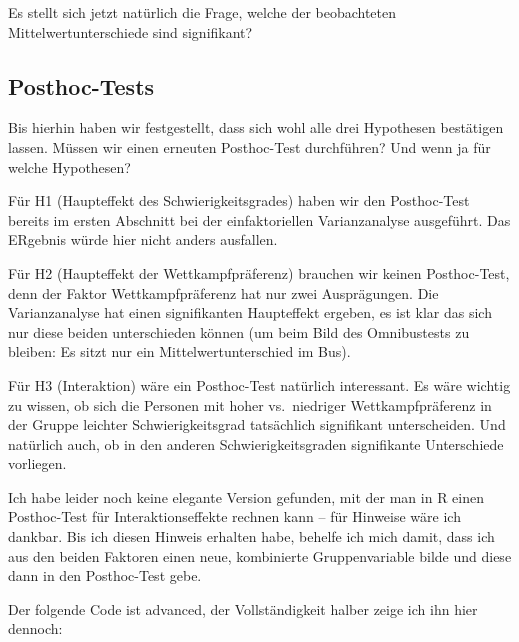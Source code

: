 \documentclass[
]{book}
\begin{document}
Es stellt sich jetzt natürlich die Frage, welche der beobachteten Mittelwertunterschiede sind signifikant?

\hypertarget{posthoc-tests}{%
\subsection{Posthoc-Tests}\label{posthoc-tests}}

Bis hierhin haben wir festgestellt, dass sich wohl alle drei Hypothesen bestätigen lassen. Müssen wir einen erneuten Posthoc-Test durchführen? Und wenn ja für welche Hypothesen?

Für H1 (Haupteffekt des Schwierigkeitsgrades) haben wir den Posthoc-Test bereits im ersten Abschnitt bei der einfaktoriellen Varianzanalyse ausgeführt. Das ERgebnis würde hier nicht anders ausfallen.

Für H2 (Haupteffekt der Wettkampfpräferenz) brauchen wir keinen Posthoc-Test, denn der Faktor Wettkampfpräferenz hat nur zwei Ausprägungen. Die Varianzanalyse hat einen signifikanten Haupteffekt ergeben, es ist klar das sich nur diese beiden unterschieden können (um beim Bild des Omnibustests zu bleiben: Es sitzt nur ein Mittelwertunterschied im Bus).

Für H3 (Interaktion) wäre ein Posthoc-Test natürlich interessant. Es wäre wichtig zu wissen, ob sich die Personen mit hoher vs.~niedriger Wettkampfpräferenz in der Gruppe leichter Schwierigkeitsgrad tatsächlich signifikant unterscheiden. Und natürlich auch, ob in den anderen Schwierigkeitsgraden signifikante Unterschiede vorliegen.

Ich habe leider noch keine elegante Version gefunden, mit der man in R einen Posthoc-Test für Interaktionseffekte rechnen kann -- für Hinweise wäre ich dankbar. Bis ich diesen Hinweis erhalten habe, behelfe ich mich damit, dass ich aus den beiden Faktoren einen neue, kombinierte Gruppenvariable bilde und diese dann in den Posthoc-Test gebe.

Der folgende Code ist advanced, der Vollständigkeit halber zeige ich ihn hier dennoch:
\end{document}
